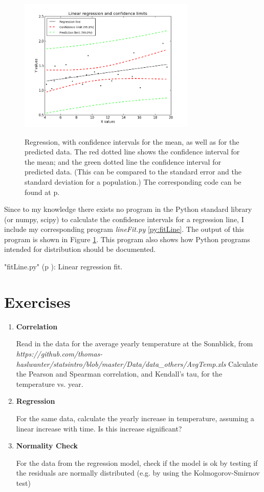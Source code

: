 \begin{figure}
  \centering
  \includegraphics[width=0.75\textwidth]{../Images/regression_wLegend.png}\\
  \caption{Regression, with confidence intervals for the mean, as well as for the predicted data. The red dotted line shows the confidence interval for the mean; and the green dotted line the confidence interval for predicted data. (This can be compared to the standard error and the standard deviation for a population.) The corresponding code can be found
  at p. \pageref{py:fitLine}} \label{fig:regline}
\end{figure}

Since to my knowledge there exists no program in the Python standard library (or numpy, scipy) to calculate the confidence intervals for a regression line, I include my corresponding program \emph{lineFit.py} \ref{py:fitLine}. The output of this program is shown in Figure \ref{fig:regline}. This program also shows how Python programs intended for distribution should be documented.

\PyImg "fitLine.py" (p \pageref{py:fitLine}): Linear regression fit.

\section{Exercises}

\begin{enumerate}
  \item \textbf{Correlation}

    Read in the data for the average yearly temperature at the Sonnblick, from     \emph{https://github.com/thomas-haslwanter/statsintro/blob/master/Data/data\_others/AvgTemp.xls}
    Calculate the Pearson and Spearman correlation, and Kendall's tau, for the temperature vs. year.

  \item \textbf{Regression}

    For the same data, calculate the yearly increase in temperature, assuming a linear increase with time.
    Is this increase significant?

  \item \textbf{Normality Check}

    For the data from the regression model, check if the model is ok by testing if the residuals are normally distributed (e.g. by using the Kolmogorov-Smirnov test)

\end{enumerate}


